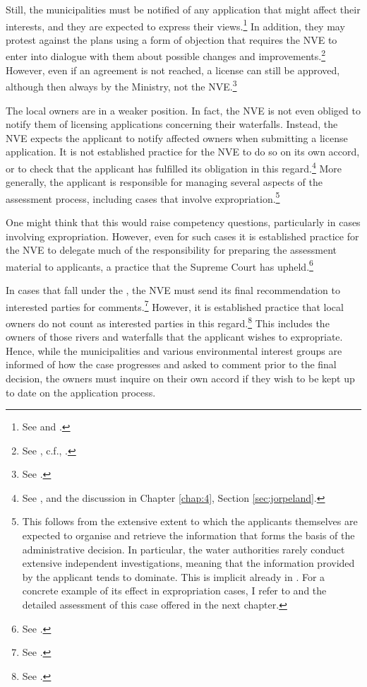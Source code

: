 Still, the municipalities must be notified of any application that might affect their interests, and they are expected to express their views.\footnote{See \cite[8]{wra17} and \cite[24]{wra00}.} In addition, they may protest against the plans using a form of objection that requires the NVE to enter into dialogue with them about possible changes and improvements.\footnote{See \cite[5-4,5-6]{pb08}, c.f., \cite[24]{wra00}.} However, even if an agreement is not reached, a license can still be approved, although then always by the Ministry, not the NVE.\footnote{See \cite[5-6]{pb08}.}

The local owners are in a weaker position. In fact, the NVE is not even obliged to notify them of licensing applications concerning their waterfalls. Instead, the NVE expects the applicant to notify affected owners when submitting a license application. It is not established practice for the NVE to do so on its own accord, or to check that the applicant has fulfilled its obligation in this regard.\footnote{See \cite{jorpeland11}, and the discussion in Chapter \ref{chap:4}, Section \ref{sec:jorpeland}.} More generally, the applicant is responsible for managing several aspects of the assessment process, including cases that involve expropriation.\footnote{This follows from the extensive extent to which the applicants themselves are expected to organise and retrieve the information that forms the basis of the administrative decision. In particular, the water authorities rarely conduct extensive independent investigations, meaning that the information provided by the applicant tends to dominate. This is implicit already in \cite{stokker10}. For a concrete example of its effect in expropriation cases, I refer to \cite{jorpeland11} and the detailed assessment of this case offered in the next chapter.}

One might think that this would raise competency questions, particularly in cases involving expropriation. However, even for such cases it is established practice for the NVE to delegate much of the responsibility for preparing the assessment material to applicants, a practice that the Supreme Court has upheld.\footnote{See \cite{jorpeland11}.}

In cases that fall under the \cite{wra17}, the NVE must send its final recommendation to interested parties for comments.\footnote{See \cite[6]{wra17}.} However, it is established practice that local owners do not count as interested parties in this regard.\footnote{See \cite{jorpeland11}.} This includes the owners of those rivers and waterfalls that the applicant wishes to expropriate. Hence, while the municipalities and various environmental interest groups are informed of how the case progresses and asked to comment prior to the final decision, the owners must inquire on their own accord if they wish to be kept up to date on the application process.

